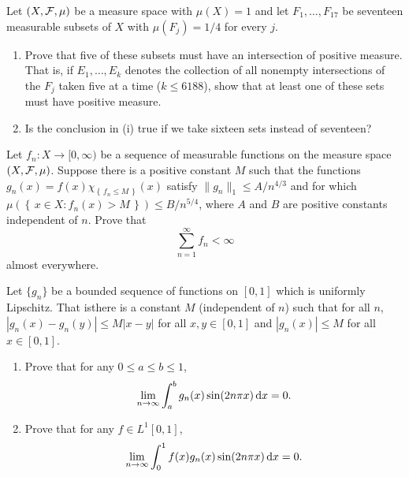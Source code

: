 \begin{problem}
  Let $(X,\mathcal{F},\mu)$ be a measure space with $\mu(X)=1$ and let
  $F_1,\ldots,F_{17}$ be seventeen measurable subsets of $X$ with
  $\mu(F_j)=1/4$ for every $j$.
  \begin{enumerate}[label=(\roman*),noitemsep]
  \item Prove that five of these subsets must have an intersection of
    positive measure. That is, if $E_1,\ldots,E_k$ denotes the collection
    of all nonempty intersections of the $F_j$ taken five at a time ($k\leq
    6188$), show that at least one of these sets must have positive
    measure.
  \item Is the conclusion in (i) true if we take sixteen sets instead of
    seventeen?
  \end{enumerate}
\end{problem}
\begin{solution}

\end{solution}

\begin{problem}
  Let $f_n\colon X\to[0,\infty)$ be a sequence of measurable functions on
  the measure space $(X,\mathcal{F},\mu)$. Suppose there is a positive constant
  $M$ such that the functions $g_n(x)=f(x)\chi_{\left\{\,f_n\leq
      M\,\right\}}(x)$ satisfy $\|g_n\|_1\leq A/n^{4/3}$ and for which
  $\mu\left(\left\{\,x\in X:f_n(x)>M\,\right\}\right)\leq B/n^{5/4}$, where
  $A$ and $B$ are positive constants independent of $n$. Prove that
  \[
    \sum_{n=1}^\infty f_n<\infty
  \]
  almost everywhere.
\end{problem}
\begin{solution}
\end{solution}

\begin{problem}
  Let $\{g_n\}$ be a bounded sequence of functions on $[0,1]$ which is
  uniformly Lipschitz. That isthere is a constant $M$ (independent of $n$)
  such that for all $n$, $|g_n(x)-g_n(y)|\leq M|x-y|$ for all $x,y\in
  [0,1]$ and $|g_n(x)|\leq M$ for all $x\in[0,1]$.
  \begin{enumerate}[label=(\roman*),noitemsep]
  \item Prove that for any $0\leq a\leq b\leq 1$,
    \[
      \lim_{n\to\infty}\int_a^b g_n(x)\sin(2n\pi x)\mathop{}\!\mathrm{d} x=0.
    \]
  \item Prove that for any $f\in L^1[0,1]$,
    \[
      \lim_{n\to\infty}\int_0^1 f(x)g_n(x)\sin(2n\pi x)\mathop{}\!\mathrm{d} x=0.
    \]
  \end{enumerate}
\end{problem}
\begin{solution}
\end{solution}


